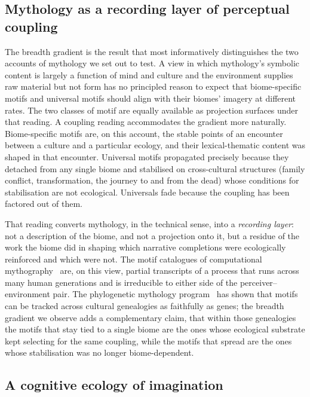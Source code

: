 \documentclass[11pt,a4paper]{article}
\begin{document}
\subsection*{Mythology as a recording layer of perceptual coupling}

The breadth gradient is the result that most informatively
distinguishes the two accounts of mythology we set out to test. A
view in which mythology's symbolic content is largely a function
of mind and culture and the environment supplies raw material but
not form has no principled reason to expect that biome-specific
motifs and universal motifs should align with their biomes'
imagery at different rates. The two classes of motif are equally
available as projection surfaces under that reading. A coupling
reading accommodates the gradient more naturally. Biome-specific
motifs are, on this account, the stable points of an encounter
between a culture and a particular ecology, and their
lexical-thematic content was shaped in that encounter. Universal
motifs propagated precisely because they detached from any single
biome and stabilised on cross-cultural structures (family
conflict, transformation, the journey to and from the dead)
whose conditions for stabilisation are not ecological. Universals
fade because the coupling has been factored out of them.

That reading converts mythology, in the technical sense, into a
\emph{recording layer}: not a description of the biome, and not a
projection onto it, but a residue of the work the biome did in
shaping which narrative completions were ecologically reinforced
and which were not. The motif catalogues of computational
mythography~\citep{berezkin2024catalogue,thuillard2018folktale,tehrani2013phylogeny}
are, on this view, partial transcripts of a process that runs
across many human generations and is irreducible to either side
of the perceiver--environment pair. The phylogenetic mythology
program~\citep{tehrani2013phylogeny,daribigne2017phylogenetic} has
shown that motifs can be tracked across cultural genealogies as
faithfully as genes; the breadth gradient we observe adds a
complementary claim, that within those genealogies the motifs
that stay tied to a single biome are the ones whose ecological
substrate kept selecting for the same coupling, while the motifs
that spread are the ones whose stabilisation was no longer
biome-dependent.

\subsection*{A cognitive ecology of imagination}
\end{document}
